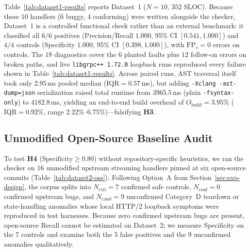 Table~\ref{tab:dataset1-results} reports Dataset~1 ($N=10$, $352$ SLOC). Because these $10$ handlers ($6$ buggy, $4$ conforming) were written alongside the checker, Dataset~1 is a controlled functional check rather than an external benchmark: it classified all $6/6$ positives (Precision/Recall $1.000$, 95\% CI $[0.541, 1.000]$) and $4/4$ controls (Specificity $1.000$, 95\% CI $[0.398, 1.000]$), with $\mathrm{FP}_v=0$ errors on controls. The $18$ diagnostics cover the $6$ planted faults plus $12$ follow-on errors on broken paths, and live \texttt{libgrpc++ 1.72.0} loopback runs reproduced every failure shown in Table~\ref{tab:dataset1-results}. Across paired runs, AST traversal itself took only $2.95$\,ms pooled median ($\mathrm{IQR}=0.57$\,ms), but adding \texttt{-Xclang -ast-dump=json} serialization raised total runtime from $3965.5$\,ms (plain \texttt{-fsyntax-only}) to $4182.8$\,ms, yielding an end-to-end build overhead of $O_{\mathrm{build}}=3.95\%$ ($\mathrm{IQR}=0.92\%$, range $2.22\%$--$6.75\%$)---falsifying \textbf{H3}.

\subsection{Unmodified Open-Source Baseline Audit}
\label{sec:oss-baseline}

To test \textbf{H4} ($\mathrm{Specificity} \ge 0.80$) without repository-specific heuristics, we ran the checker on $16$ unmodified upstream streaming handlers pinned at six open-source commits (Table~\ref{tab:dataset2-oss}). Following Option~A from Section~\ref{sec:exp-design}, the corpus splits into $N_{\mathrm{ctrl}}=7$ confirmed safe controls, $N_{\mathrm{conf}}=0$ confirmed upstream bugs, and $N_{\mathrm{cand}}=9$ unconfirmed Category~D teardown or state-handling anomalies whose local HTTP/2 loopback symptoms were reproduced in test harnesses. Because zero confirmed upstream bugs are present, open-source Recall cannot be estimated on Dataset~2; we measure Specificity on the $7$ controls and examine both the $5$ false positives and the $9$ unconfirmed anomalies qualitatively.


